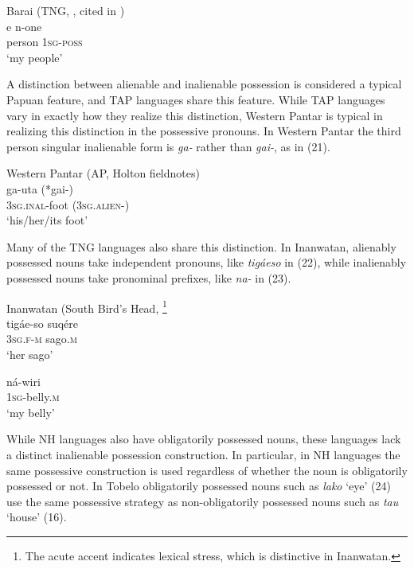 \ea%
Barai (TNG, \citet{Olson1981}, cited in \citet{Foley1986}) \\
\gll  e n-one \\
   person \textsc{1sg-poss} \\
\glt `my people'
\z





A distinction between alienable and inalienable possession is considered a typical Papuan feature, and TAP languages share this feature. While TAP languages vary in exactly how they realize this distinction, Western Pantar is typical in realizing this distinction in the possessive pronouns. In Western Pantar the third person singular inalienable form is \textit{ga-} rather than \textit{gai-}, as in (21).

\ea%
Western Pantar (AP, Holton fieldnotes)\\
\gll  ga-uta  (*gai-) \\
  \textsc{3sg.inal}-foot  \textsc{(3sg.alien-)} \\
\glt `his/her/its foot'
\z

Many of the TNG languages also share this distinction. In Inanwatan, alienably possessed nouns take independent pronouns, like \textit{tig\'aeso} in (22), while inalienably possessed nouns take pronominal prefixes, like \textit{na- }in (23).

\ea%
Inanwatan (South Bird's Head, \citep[29,30]{DeVries2004}\footnote{The acute accent indicates lexical stress, which is distinctive in Inanwatan.}\\
\gll  tig\'ae-so suq\'ere \\
  \textsc{3sg.f}-\textsc{m} sago.\textsc{m} \\
\glt `her sago'
\z





\ea%
\gll  n\'a-wiri \\
 \textsc{1sg}-belly.\textsc{m}  \\
\glt `my belly'
\z





While NH languages also have obligatorily possessed nouns, these languages lack a distinct inalienable possession construction. In particular, in NH languages the same possessive construction is used regardless of whether the noun is obligatorily possessed or not. In Tobelo obligatorily possessed nouns such as \textit{lako }`eye' (24) use the same possessive strategy as non-obligatorily possessed nouns such as \textit{tau }`house' (16).

